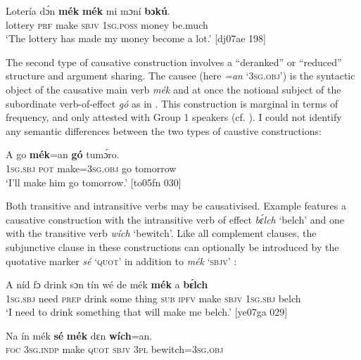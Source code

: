 \ea%
    \label{ex:key:1321}
    \gll Lotería  dɔ́n  \textbf{mék}    \textbf{mék}    mi    mɔní  \textbf{bɔkú}.\\
lottery  \textsc{prf}  make  \textsc{sbjv}    \textsc{1sg.poss}  money  be.much\\

\glt ‘The lottery has made my money become a lot.’ [dj07ae 198]
\z

The second type of causative construction involves a “deranked” \citep{Cristofaro2003} or “reduced” \citep{Lehmann1988} structure and argument sharing. The causee (here \textit{=an} \textsc{‘3sg.obj’}) is the syntactic object of the causative main verb \textit{mék} and at once the notional subject of the subordinate verb-of-effect \textit{gó} as in . This construction is marginal in terms of frequency, and only attested with Group 1 speakers (cf. ). I could not identify any semantic differences between the two types of caustive constructions:


\ea%
    \label{ex:key:1322}
    \gll A    go  \textbf{mék}=an      \textbf{gó}  tumɔ́ro.\\
\textsc{1sg.sbj}  \textsc{pot}  make=\textsc{3sg.obj}    go  tomorrow\\

\glt ‘I’ll make him go tomorrow.’ [to05fn 030]
\z

Both transitive and intransitive verbs may be causativised. Example  features a causative construction with the intransitive verb of effect \textit{bɛ́lch} ‘belch’ and  one with the transitive verb \textit{wích} ‘bewitch’. Like all complement clauses, the subjunctive clause in these constructions can optionally be introduced by the quotative marker \textit{sé} ‘\textsc{quot}’ in addition to \textit{mék} ‘\textsc{sbjv}’ :


\ea%
    \label{ex:key:1323}
    \gll A    níd    fɔ  drink  sɔn    tín    wé  de  mék
\textbf{mék}    a    \textbf{bɛ́lch}\\
\textsc{1sg.sbj}  need  \textsc{prep}  drink  some  thing  \textsc{sub}  \textsc{ipfv}  make
\textsc{sbjv}    \textsc{1sg.sbj}  belch\\

\glt ‘I need to drink something that will make me belch.’ [ye07ga 029]
\z


\ea%
    \label{ex:key:1324}
    \gll Na  ín    mék    \textbf{sé}    \textbf{mék}    dɛn  \textbf{wích}=an.\\
\textsc{foc}  \textsc{3sg.indp}  make  \textsc{quot}    \textsc{sbjv}    \textsc{3pl}  bewitch=\textsc{3sg.obj}\\

